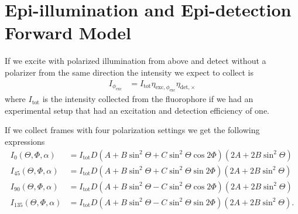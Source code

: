 \documentclass[11pt]{article}
\begin{document}
\section{Epi-illumination and Epi-detection Forward Model}
If we excite with polarized illumination from above and detect without a
polarizer from the same direction the intensity we expect to collect is
\begin{align}
  I_{\phi_{\text{exc}}} &= I_{\text{tot}}\eta_{\text{exc},\phi_{\text{exc}}}\eta_{\text{det}, \times}
\end{align}
where $I_{\text{tot}}$ is the intensity collected from the fluorophore if we had
an experimental setup that had an excitation and detection efficiency of one.

If we collect frames with four polarization settings we get the following expressions
\begin{subequations}
\begin{align}
  I_{0}(\Theta, \Phi, \alpha) &= I_{\text{tot}}D(A + B\sin^{2}{\Theta} + C\sin^{2}{\Theta} \cos{2 \Phi})(2A + 2B\sin^2\Theta)\\
  I_{45}(\Theta, \Phi, \alpha) &= I_{\text{tot}}D(A + B\sin^{2}{\Theta} + C\sin^{2}{\Theta} \sin{2 \Phi})(2A + 2B\sin^2\Theta)\\
  I_{90}(\Theta, \Phi, \alpha) &= I_{\text{tot}}D(A + B\sin^{2}{\Theta} - C\sin^{2}{\Theta} \cos{2 \Phi})(2A + 2B\sin^2\Theta)\\
  I_{135}(\Theta, \Phi, \alpha) &= I_{\text{tot}}D(A + B\sin^{2}{\Theta} - C\sin^{2}{\Theta} \sin{2 \Phi})(2A + 2B\sin^2\Theta).
\end{align}\label{eq:int1}
\end{subequations}
\end{document}
